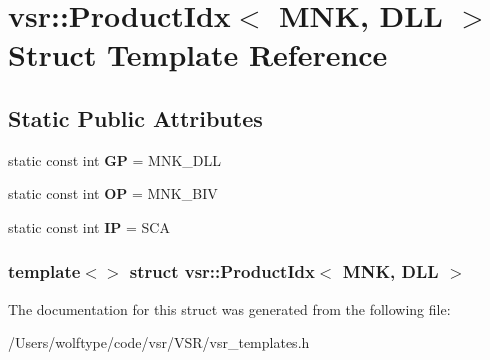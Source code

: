 \hypertarget{structvsr_1_1_product_idx_3_01_m_n_k_00_01_d_l_l_01_4}{\section{vsr\-:\-:Product\-Idx$<$ M\-N\-K, D\-L\-L $>$ Struct Template Reference}
\label{structvsr_1_1_product_idx_3_01_m_n_k_00_01_d_l_l_01_4}
}
\subsection*{Static Public Attributes}
\begin{DoxyCompactItemize}
\item 
\hypertarget{structvsr_1_1_product_idx_3_01_m_n_k_00_01_d_l_l_01_4_ab0e54567e7725d76f267709efbb1958b}{static const int {\bfseries G\-P} = M\-N\-K\-\_\-\-D\-L\-L}\label{structvsr_1_1_product_idx_3_01_m_n_k_00_01_d_l_l_01_4_ab0e54567e7725d76f267709efbb1958b}

\item 
\hypertarget{structvsr_1_1_product_idx_3_01_m_n_k_00_01_d_l_l_01_4_afe0557c4d51d0dbceaa55ace79035938}{static const int {\bfseries O\-P} = M\-N\-K\-\_\-\-B\-I\-V}\label{structvsr_1_1_product_idx_3_01_m_n_k_00_01_d_l_l_01_4_afe0557c4d51d0dbceaa55ace79035938}

\item 
\hypertarget{structvsr_1_1_product_idx_3_01_m_n_k_00_01_d_l_l_01_4_a6c306a67b44dea0d48d29e63cebe09f4}{static const int {\bfseries I\-P} = S\-C\-A}\label{structvsr_1_1_product_idx_3_01_m_n_k_00_01_d_l_l_01_4_a6c306a67b44dea0d48d29e63cebe09f4}

\end{DoxyCompactItemize}
\subsubsection*{template$<$$>$ struct vsr\-::\-Product\-Idx$<$ M\-N\-K, D\-L\-L $>$}



The documentation for this struct was generated from the following file\-:\begin{DoxyCompactItemize}
\item 
/\-Users/wolftype/code/vsr/\-V\-S\-R/vsr\-\_\-templates.\-h\end{DoxyCompactItemize}
